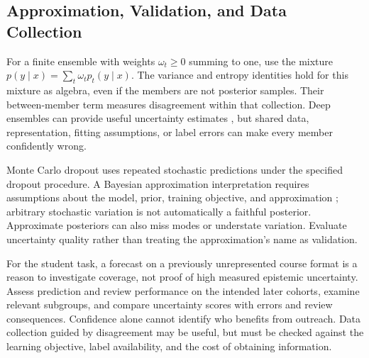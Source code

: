 \subsection{Approximation, Validation, and Data Collection}

For a finite ensemble with weights $\omega_t\ge0$ summing to one, use the mixture $p(y\mid x)=\sum_t\omega_t p_t(y\mid x)$. The variance and entropy identities hold for this mixture as algebra, even if the members are not posterior samples. Their between-member term measures disagreement within that collection. Deep ensembles can provide useful uncertainty estimates \citep{lakshminarayanan2017ensembles}, but shared data, representation, fitting assumptions, or label errors can make every member confidently wrong.

Monte Carlo dropout uses repeated stochastic predictions under the specified dropout procedure. A Bayesian approximation interpretation requires assumptions about the model, prior, training objective, and approximation \citep{gal2016dropout}; arbitrary stochastic variation is not automatically a faithful posterior. Approximate posteriors can also miss modes or understate variation. Evaluate uncertainty quality rather than treating the approximation's name as validation.

For the student task, a forecast on a previously unrepresented course format is a reason to investigate coverage, not proof of high measured epistemic uncertainty. Assess prediction and review performance on the intended later cohorts, examine relevant subgroups, and compare uncertainty scores with errors and review consequences. Confidence alone cannot identify who benefits from outreach. Data collection guided by disagreement may be useful, but must be checked against the learning objective, label availability, and the cost of obtaining information.

